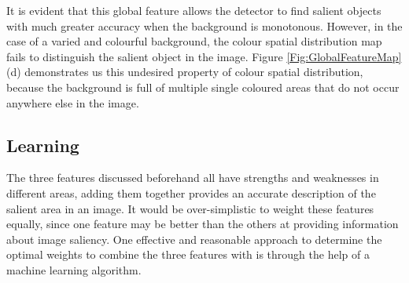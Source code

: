 \documentclass[10pt,twocolumn,letterpaper]{article}
\begin{document}
It is evident that this global feature allows the detector to find salient objects with much greater accuracy when the background is monotonous. However, in the case of a varied and colourful background, the colour spatial distribution map fails to distinguish the salient object in the image. Figure \ref{Fig:GlobalFeatureMap} (d) demonstrates us this undesired property of colour spatial distribution, because the background is full of multiple single coloured areas that do not occur anywhere else in the image.








\newcommand{\bl}{\boldsymbol{\lambda}}
\newcommand{\bt}{\boldsymbol{t}}
\newcommand{\btx}{\boldsymbol{t}_x}
\newcommand{\bphix}{\boldsymbol{\phi}_x}

\subsection{Learning}
The three features discussed beforehand all have strengths and weaknesses in different areas, adding them together provides an accurate description of the salient area in an image.  It would be over-simplistic to weight these features equally, since one feature may be better than the others at providing information about image saliency. One effective and reasonable approach to determine the optimal weights to combine the three features with is through the help of a machine learning algorithm. 
\end{document}

